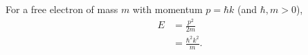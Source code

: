 For a free electron of mass $m$ with momentum $p = \hbar k$ (and $\hbar, m > 0$),
\begin{align}
  E &= \frac{p^2}{2m} \\
    &= \frac{\hbar^2 k^2}{m} .
\end{align}
